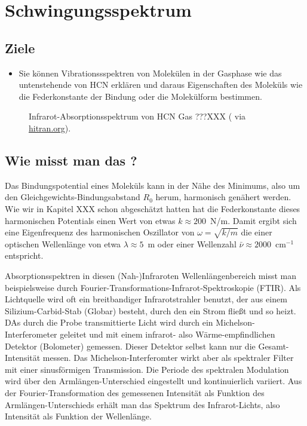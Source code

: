 \renewcommand{\lastmod}{\today}

\chapter{Schwingungsspektrum}


\section{Ziele}

\begin{itemize}
\item Sie können Vibrationssspektren von Molekülen in der Gasphase wie das untenstehende von HCN erklären und daraus Eigenschaften des Moleküls wie die  Federkonstante der Bindung oder die  Molekülform bestimmen.
\end{itemize}

\begin{figure}
\caption{Infrarot-Absorptionsspektrum von HCN Gas ???XXX (\cite{Maki_1995_HCN} via \href{https://hitran.org}{hitran.org}).
\label{fig:vib_hcn}}
\end{figure}



\section{Wie misst man das ?}

Das Bindungspotential eines Moleküls kann in der Nähe des Minimums, also um den Gleichgewichts-Bindungsabstand $R_0$ herum, harmonisch genähert werden.
Wie wir in Kapitel XXX schon abgeschätzt hatten hat die Federkonstante dieses harmonischen Potentials einen Wert von etwas $k \approx 200$~N/m. Damit ergibt sich eine Eigenfrequenz des harmonischen Oszillator von $\omega = \sqrt{k / m}$ die einer optischen Wellenlänge von etwa $\lambda \approx 5$~\textmu m oder einer Wellenzahl $\bar{\nu} \approx 2000$~cm$^{-1}$ entspricht. 

Absorptionsspektren in diesen (Nah-)Infraroten Wellenlängenbereich misst man beispielsweise durch Fourier-Transformations-Infrarot-Spektroskopie (FTIR). Als Lichtquelle wird oft ein breitbandiger Infrarotstrahler benutzt, der aus einem Silizium-Carbid-Stab (Globar) besteht, durch den ein Strom fließt und so heizt. DAs durch die Probe transmittierte Licht wird durch ein Michelson-Interferometer geleitet und mit einem infrarot-  also Wärme-empfindlichen Detektor (Bolometer) gemessen. Dieser Detektor selbst kann nur die Gesamt-Intensität messen. Das Michelson-Interferomter wirkt aber als spektraler Filter mit einer sinusförmigen Transmission. Die Periode des spektralen Modulation wird über den Armlängen-Unterschied eingestellt und kontinuierlich variiert. Aus der Fourier-Transformation des gemessenen Intensität als Funktion des Armlängen-Unterschieds erhält man das Spektrum des Infrarot-Lichts, also Intensität als Funktion der Wellenlänge.



